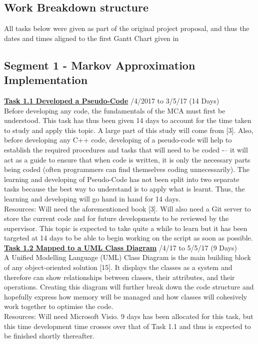 \documentclass[11pt,draftd]{article}
\begin{document}
\begin{appendices}
	\section{Work Breakdown structure}\label{app_itemB}
	All tasks below were given as part of the original project proposal, and thus the dates and times aligned to the first Gantt Chart given in 
	\subsection{Segment 1 - Markov Approximation Implementation}
	\underline{\textbf{Task 1.1 Developed a Pseudo-Code}} /4/2017 to 3/5/17 (14 Days) \\
	
	\noindent Before developing any code, the fundamentals of the MCA must first be understood. This task has thus been given 14 days to account for the time taken to study and apply this topic. A large part of this study will come from [3]. Also, before developing any C++ code, developing of a pseudo-code will help to establish the required procedures and tasks that will need to be coded -– it will act as a guide to ensure that when code is written, it is only the necessary parts being coded (often programmers can find themselves coding unnecessarily). 
	The learning and developing of Pseudo-Code has not been split into two separate tasks because the best way to understand is to apply what is learnt. Thus, the learning and developing will go hand in hand for 14 days. \\
	Resources: Will need the aforementioned book [3]. Will also need a Git server to store the current code and for future developments to be reviewed by the supervisor. This topic is expected to take quite a while to learn but it has been targeted at 14 days to be able to begin working on the script as soon as possible. \\
		
	\noindent\underline{\textbf{Task 1.2 Mapped to a UML Class Diagram}} /4/17 to 5/5/17 (9 Days) \\
	
	\noindent A Unified Modelling Language (UML) Class Diagram is the main building block of any object-oriented solution [15]. It displays the classes as a system and therefore can show relationships between classes, their attributes, and their operations. Creating this diagram will further break down the code structure and hopefully express how memory will be managed and how classes will cohesively work together to optimise the code. \\
	Resources: Will need Microsoft Visio. 9 days has been allocated for this task, but this time development time crosses over that of Task 1.1 and thus is expected to be finished shortly thereafter. \\
	

\end{appendices}
\end{document}
